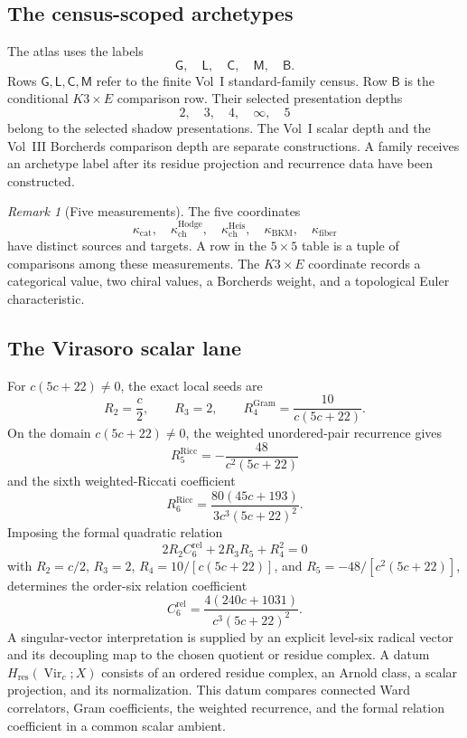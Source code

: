 \documentclass[11pt]{article}
\theoremstyle{plain}
\theoremstyle{definition}
\theoremstyle{remark}
\newtheorem{remark}[theorem]{Remark}
\begin{document}
\subsection{The census-scoped archetypes}

The atlas uses the labels
\[
 \mathsf G,\quad\mathsf L,\quad\mathsf C,\quad
 \mathsf M,\quad\mathsf B.
\]
Rows \(\mathsf G,\mathsf L,\mathsf C,\mathsf M\) refer to the
finite Vol~I standard-family census.  Row \(\mathsf B\) is the
conditional \(K3\times E\) comparison row.  Their selected
presentation depths
\[
 2,\quad3,\quad4,\quad\infty,\quad5
\]
belong to the selected shadow presentations.  The Vol~I scalar depth
and the Vol~III Borcherds comparison depth are separate constructions.
A family receives an archetype label after its residue projection and
recurrence data have been constructed.

\begin{remark}[Five measurements]
The five coordinates
\[
 \kappa_{\mathrm{cat}},\quad
 \kappa_{\mathrm{ch}}^{\mathrm{Hodge}},\quad
 \kappa_{\mathrm{ch}}^{\mathrm{Heis}},\quad
 \kappa_{\mathrm{BKM}},\quad
 \kappa_{\mathrm{fiber}}
\]
have distinct sources and targets.  A row in the \(5\times5\) table
is a tuple of comparisons among these measurements.  The
\(K3\times E\) coordinate records a categorical value, two chiral
values, a Borcherds weight, and a topological Euler characteristic.
\end{remark}

\subsection{The Virasoro scalar lane}

For \(c(5c+22)\ne0\), the exact local seeds are
\[
 R_2=\frac c2,\qquad R_3=2,\qquad
 R_4^{\mathrm{Gram}}=\frac{10}{c(5c+22)}.
\]
On the domain \(c(5c+22)\ne0\), the weighted unordered-pair
recurrence gives
\[
 R_5^{\mathrm{Ricc}}
 =-\frac{48}{c^2(5c+22)}
\]
and the sixth weighted-Riccati coefficient
\[
 R_6^{\mathrm{Ricc}}
 =\frac{80(45c+193)}
 {3c^3(5c+22)^2}.
\]
Imposing the formal quadratic relation
\[
 2R_2C_6^{\mathrm{rel}}+2R_3R_5+R_4^2=0
\]
with \(R_2=c/2\), \(R_3=2\),
\(R_4=10/[c(5c+22)]\), and
\(R_5=-48/[c^2(5c+22)]\), determines the order-six relation coefficient
\[
 C_6^{\mathrm{rel}}
 =\frac{4(240c+1031)}
 {c^3(5c+22)^2}.
\]
A singular-vector interpretation is supplied by an explicit level-six
radical vector and its decoupling map to the chosen quotient or residue
complex.
A datum \(H_{\mathrm{res}}(\operatorname{Vir}_c;X)\) consists of an
ordered residue complex, an Arnold class, a scalar projection, and
its normalization.  This datum compares connected Ward correlators,
Gram coefficients, the weighted recurrence, and the formal relation
coefficient in a common scalar ambient.
\end{document}
